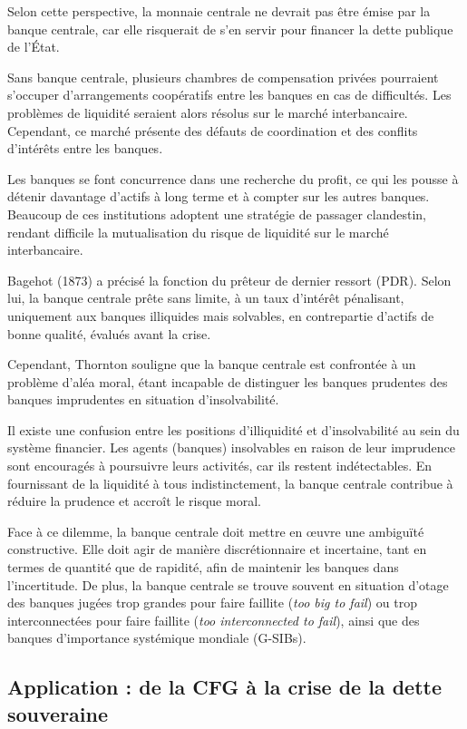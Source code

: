 \documentclass[a4paper, 12pt]{report}
\begin{document}
Selon cette perspective, la monnaie centrale ne devrait pas être émise par la banque centrale, car elle risquerait de s'en servir pour financer la dette publique de l'État.

Sans banque centrale, plusieurs chambres de compensation privées pourraient s'occuper d'arrangements coopératifs entre les banques en cas de difficultés. Les problèmes de liquidité seraient alors résolus sur le marché interbancaire. Cependant, ce marché présente des défauts de coordination et des conflits d'intérêts entre les banques. 

Les banques se font concurrence dans une recherche du profit, ce qui les pousse à détenir davantage d'actifs à long terme et à compter sur les autres banques. Beaucoup de ces institutions adoptent une stratégie de passager clandestin, rendant difficile la mutualisation du risque de liquidité sur le marché interbancaire.

Bagehot (1873) a précisé la fonction du prêteur de dernier ressort (PDR). Selon lui, la banque centrale prête sans limite, à un taux d'intérêt pénalisant, uniquement aux banques illiquides mais solvables, en contrepartie d'actifs de bonne qualité, évalués avant la crise. 

Cependant, Thornton souligne que la banque centrale est confrontée à un problème d'aléa moral, étant incapable de distinguer les banques prudentes des banques imprudentes en situation d'insolvabilité.

Il existe une confusion entre les positions d'illiquidité et d'insolvabilité au sein du système financier. Les agents (banques) insolvables en raison de leur imprudence sont encouragés à poursuivre leurs activités, car ils restent indétectables. En fournissant de la liquidité à tous indistinctement, la banque centrale contribue à réduire la prudence et accroît le risque moral.

Face à ce dilemme, la banque centrale doit mettre en œuvre une ambiguïté constructive. Elle doit agir de manière discrétionnaire et incertaine, tant en termes de quantité que de rapidité, afin de maintenir les banques dans l'incertitude. De plus, la banque centrale se trouve souvent en situation d'otage des banques jugées trop grandes pour faire faillite (\textit{too big to fail}) ou trop interconnectées pour faire faillite (\textit{too interconnected to fail}), ainsi que des banques d'importance systémique mondiale (G-SIBs).

\subsection{Application : de la CFG à la crise de la dette souveraine}
\end{document}
